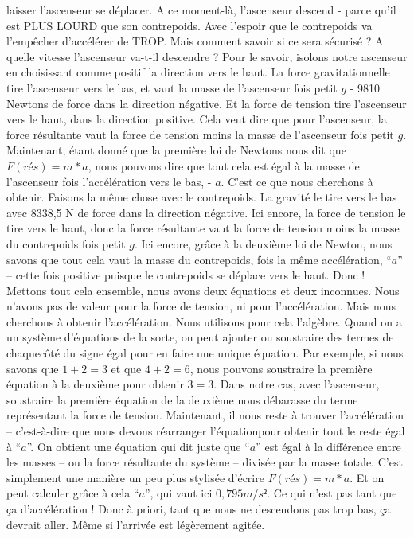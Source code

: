 \documentclass[a4paper, twoside]{article}
\begin{document}
laisser l'ascenseur se déplacer. A ce moment-là, l'ascenseur descend -
parce qu'il est PLUS LOURD que son contrepoids. Avec l'espoir que le
contrepoids va l'empêcher d'accélérer de TROP. Mais comment savoir si ce
sera sécurisé ? A quelle vitesse l'ascenseur va-t-il descendre ? Pour le
savoir, isolons notre ascenseur en choisissant comme positif la
direction vers le haut. La force gravitationnelle tire l'ascenseur vers
le bas, et vaut la masse de l'ascenseur fois petit \(g\) - 9810 Newtons
de force dans la direction négative. Et la force de tension tire
l'ascenseur vers le haut, dans la direction positive. Cela veut dire que
pour l'ascenseur, la force résultante vaut la force de tension moins la
masse de l'ascenseur fois petit \(g\). Maintenant, étant donné que la
première loi de Newtons nous dit que \(F(rés) = m*a\), nous pouvons dire
que tout cela est égal à la masse de l'ascenseur fois l'accélération
vers le bas, - \(a\). C'est ce que nous cherchons à obtenir. Faisons la
même chose avec le contrepoids. La gravité le tire vers le bas avec
8338,5 N de force dans la direction négative. Ici encore, la force de
tension le tire vers le haut, donc la force résultante vaut la force de
tension moins la masse du contrepoids fois petit \(g\). Ici encore,
grâce à la deuxième loi de Newton, nous savons que tout cela vaut la
masse du contrepoids, fois la même accélération, ``\(a\)'' -- cette fois
positive puisque le contrepoids se déplace vers le haut. Donc ! Mettons
tout cela ensemble, nous avons deux équations et deux inconnues. Nous
n'avons pas de valeur pour la force de tension, ni pour l'accélération.
Mais nous cherchons à obtenir l'accélération. Nous utilisons pour cela
l'algèbre. Quand on a un système d'équations de la sorte, on peut
ajouter ou soustraire des termes de chaquecôté du signe égal pour en
faire une unique équation. Par exemple, si nous savons que \(1 + 2 = 3\)
et que \(4 + 2 = 6\), nous pouvons soustraire la première équation à la
deuxième pour obtenir \(3 = 3\). Dans notre cas, avec l'ascenseur,
soustraire la première équation de la deuxième nous débarasse du terme
représentant la force de tension. Maintenant, il nous reste à trouver
l'accélération -- c'est-à-dire que nous devons réarranger l'équationpour
obtenir tout le reste égal à ``\(a\)''. On obtient une équation qui dit
juste que ``\(a\)'' est égal à la différence entre les masses -- ou la
force résultante du système -- divisée par la masse totale. C'est
simplement une manière un peu plus stylisée d'écrire \(F(rés) = m*a\).
Et on peut calculer grâce à cela ``\(a\)'', qui vaut ici
\(0, 795 m/s²\). Ce qui n'est pas tant que ça d'accélération ! Donc à
priori, tant que nous ne descendons pas trop bas, ça devrait aller. Même
si l'arrivée est légèrement agitée.
\end{document}
